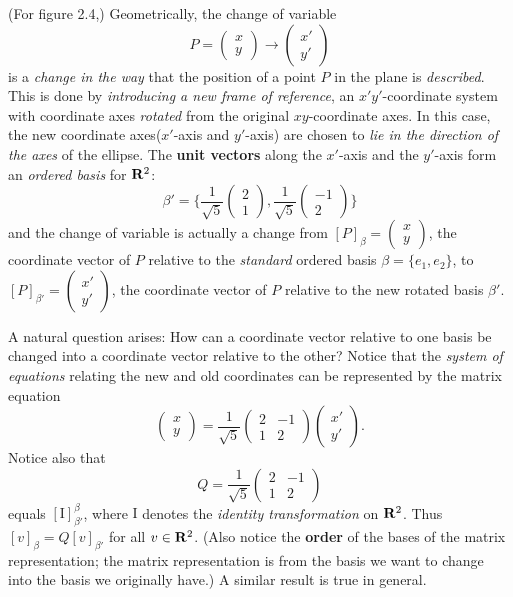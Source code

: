 (For figure 2.4,) Geometrically, the change of variable
\[
    P = \begin{pmatrix} x \\ y \end{pmatrix} \to \begin{pmatrix} x' \\ y' \end{pmatrix}
\]
is a \emph{change in the way} that the position of a point \(P\) in the plane is \emph{described}.
This is done by \emph{introducing a new frame of reference}, an \(x'y'\)-coordinate system with coordinate axes \emph{rotated} from the original \(xy\)-coordinate axes.
In this case, the new coordinate axes(\(x'\)-axis and \(y'\)-axis) are chosen to \emph{lie in the direction of the axes} of the ellipse.
The \textbf{unit vectors} along the \(x'\)-axis and the \(y'\)-axis form an \emph{ordered basis} for \(\mathbf{R}^2\):
\[
    \beta' = \bigg\{ \frac{1}{\sqrt{5}} \begin{pmatrix} 2 \\ 1 \end{pmatrix}, \frac{1}{\sqrt{5}} \begin{pmatrix} -1 \\ 2 \end{pmatrix} \bigg\}
\]
and the change of variable is actually a change from \([P]_{\beta} = \begin{pmatrix} x \\ y \end{pmatrix}\), the coordinate vector of \(P\) relative to the \emph{standard} ordered basis \(\beta = \{ e_1, e_2 \}\), to \([P]_{\beta'} = \begin{pmatrix} x' \\ y' \end{pmatrix}\), the coordinate vector of \(P\) relative to the new rotated basis \(\beta'\).

A natural question arises:
How can a coordinate vector relative to one basis be changed into a coordinate vector relative to the other?
Notice that the \emph{system of equations} relating the new and old coordinates can be represented by the matrix equation
\[
    \begin{pmatrix} x \\ y \end{pmatrix}
    = \frac{1}{\sqrt{5}} \begin{pmatrix}
        2 & -1 \\ 1 & 2
    \end{pmatrix} \begin{pmatrix} x' \\ y' \end{pmatrix}.
\]
Notice also that
\[
    Q = \frac{1}{\sqrt{5}} \begin{pmatrix}
        2 & -1 \\ 1 & 2
    \end{pmatrix}
\]
equals \([\mathrm{I}]_{\beta'}^{\beta}\), where \(\mathrm{I}\) denotes the \emph{identity transformation} on \(\mathbf{R}^2\).
Thus \([v]_{\beta} = Q[v]_{\beta'}\) for all \(v \in \mathbf{R}^2\).
(Also notice the \textbf{order} of the bases of the matrix representation;
the matrix representation is from the basis we want to change into the basis we originally have.)
A similar result is true in general.

